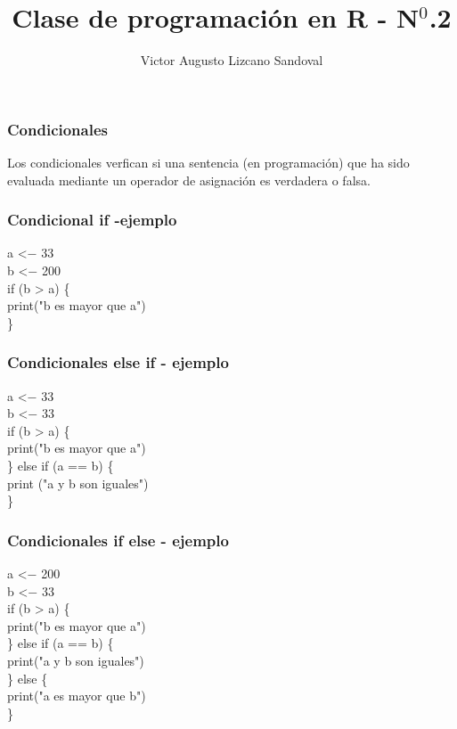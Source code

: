 \documentclass[11pt]{beamer}
\begin{document}
	\author{Victor Augusto Lizcano Sandoval}
	\title{Clase de programación en R - N$^{0}$.2}
	\begin{frame}[plain]
		\maketitle
	\end{frame}
	
	\begin{frame}
		\frametitle{Condicionales}
		
		Los condicionales verfican si una sentencia (en programación) que ha sido evaluada mediante un operador de asignación es verdadera o falsa.
		
		
		
	\end{frame}

	\begin{frame}
		\frametitle{Condicional if -ejemplo}
		a <$-$ 33 \\
		b <$-$ 200 \\
		
		if (b > a) \{ \\
			print("b es mayor que a") \\
		\}
		
	\end{frame}

	\begin{frame}
		\frametitle{Condicionales else if - ejemplo}
		a <$-$ 33\\
		b <$-$ 33\\
		
		if (b > a) \{\\
			print("b es mayor que a")\\
		\} else if (a == b) \{\\
			print ("a y b son iguales")\\
		\} 
		
	\end{frame}

	\begin{frame}
		\frametitle{Condicionales if else - ejemplo}
		
		a <$-$ 200\\
		b <$-$ 33\\
		
		if (b > a) \{\\
			print("b es mayor que a")\\
		\} else if (a == b) \{\\
			print("a y b son iguales")\\
		\} else \{\\
			print("a es mayor que b")\\
		\} 
		
	\end{frame}
\end{document}
